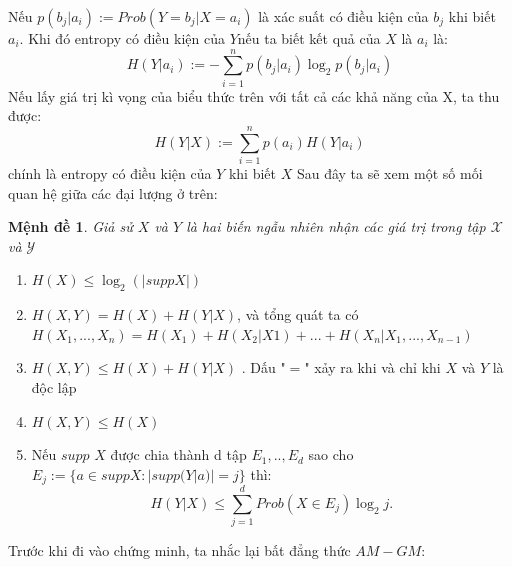 \documentclass[a4paper, 12pt]{report}
\newtheorem{Proposition}{Mệnh đề } %
\begin{document}
Nếu \(p(b_{j}|a_{i}):= Prob(Y=b_{j}|X=a_{i})\) là xác suất có điều kiện của $b_j$ khi biết $a_i$. Khi đó entropy có điều kiện của \(Y\)nếu ta biết kết quả của \(X\) là \(a_{i}\) là:
\begin{equation*}
    H(Y|a_{i}) := -\sum_{i=1}^{n}p(b_{j}|a_{i})\log_{2}p(b_{j}|a_{i})
\end{equation*}
Nếu lấy giá trị kì vọng của biểu thức trên với tất cả các khả năng của X, ta thu được:
\begin{equation*}
    H(Y|X) := \sum_{i=1}^{n}p(a_{i})H(Y|a_{i})
\end{equation*}
chính là entropy có điều kiện của $Y$ khi biết $X$
Sau đây ta sẽ xem một số mối quan hệ giữa các đại lượng ở trên:
\begin{Proposition}
Giả sử $X$ và $Y$ là hai biến ngẫu nhiên nhận các giá trị trong tập $\mathscr{X}$ và $\mathscr{Y}$
\end{Proposition}
\begin{enumerate}[label=\textbf{(\Alph*)}]
\item \(H(X) \leq \log_{2}(|supp X|)\)
\item \(H(X,Y) = H(X) + H(Y|X)\), và tổng quát ta có \(H(X_{1},...,X_{n}) = H(X_{1}) + H(X_{2}|X{1}) + ... + H(X_{n}|X_{1},...,X_{n-1})\)
\item \(H(X,Y) \leq H(X) + H(Y|X)\) . Dấu "$=$" xảy ra khi và chỉ khi $X$ và $Y$ là độc lập
\item \(H(X,Y) \leq H(X) \)
\item Nếu \(supp\) \(X\) được chia thành d tập \(E_{1},..,E_{d}\) sao cho \(E_{j}:= \{a \in suppX : |supp(Y|a)| = j \} \) thì:
\begin{equation*}
    H(Y|X) \leq \sum_{j=1}^{d}Prob(X \in E_{j})\log_{2}j.
\end{equation*}
\end{enumerate}
Trước khi đi vào chứng minh, ta nhắc lại bất đẳng thức $AM-GM$: 
\end{document}
